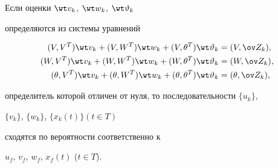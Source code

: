  


\begin{thm} Если оценки $\wt v_k$, $\wt w_k$, $\wt\vartheta_k$ 


определяются из системы уравнений 


\begin{align} 


(V,V^T)\wt v_k+(V,W^T)\wt w_k+(V,\theta^T)\wt\vartheta_k&= 


(V,\ov Z_k),\notag\\ 


% 


(W,V^T)\wt v_k+(W,W^T)\wt w_k+(W,\theta^T)\wt\vartheta_k&= 


(W,\ov Z_k),\\ 


% 


(\theta,V^T)\wt v_k+(\theta,W^T)\wt w_k+ 


(\theta,\theta^T)\wt\vartheta_k&= 


(\theta,\ov Z_k),\notag 


\end{align} 


определитель которой отличен от нуля, то последовательности $\{u_k\}$, 


$\{v_k\}$, $\{w_k\}$, $\{x_k(t)\}$\linebreak $(t\in T)$ 


сходятся по вероятности соответственно к 


$u_f$, $v_f$, $w_f$, $x_f(t)$ ($t\in T$).


\end{thm} 


 


